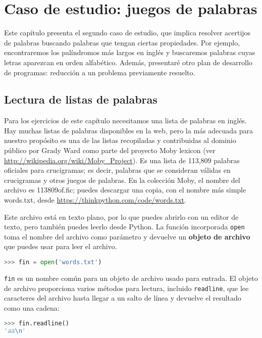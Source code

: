 \chapter{Caso de estudio: juegos de palabras}

Este capítulo presenta el segundo caso de estudio, que implica resolver acertijos de palabras buscando palabras que tengan ciertas propiedades. Por ejemplo, encontraremos los palíndromos más largos en inglés y buscaremos palabras cuyas letras aparezcan en orden alfabético. Además, presentaré otro plan de desarrollo de programas: reducción a un problema previamente resuelto.

\section{Lectura de listas de palabras}

Para los ejercicios de este capítulo necesitamos una lista de palabras en inglés. Hay muchas listas de palabras disponibles en la web, pero la más adecuada para nuestro propósito es una de las listas recopiladas y contribuidas al dominio público por Grady Ward como parte del proyecto Moby lexicon (ver \url{http://wikipedia.org/wiki/Moby_Project}). Es una lista de 113,809 palabras oficiales para crucigramas; es decir, palabras que se consideran válidas en crucigramas y otros juegos de palabras. En la colección Moby, el nombre del archivo es 113809of.fic; puedes descargar una copia, con el nombre más simple words.txt, desde \url{https://thinkpython.com/code/words.txt}.

Este archivo está en texto plano, por lo que puedes abrirlo con un editor de texto, pero también puedes leerlo desde Python. La función incorporada \texttt{open} toma el nombre del archivo como parámetro y devuelve un \textbf{objeto de archivo} que puedes usar para leer el archivo.

\begin{lstlisting}[language=Python]
>>> fin = open('words.txt')
\end{lstlisting}

\texttt{fin} es un nombre común para un objeto de archivo usado para entrada. El objeto de archivo proporciona varios métodos para lectura, incluido \texttt{readline}, que lee caracteres del archivo hasta llegar a un salto de línea y devuelve el resultado como una cadena:

\begin{lstlisting}[language=Python]
>>> fin.readline()
'aa\n'
\end{lstlisting}

